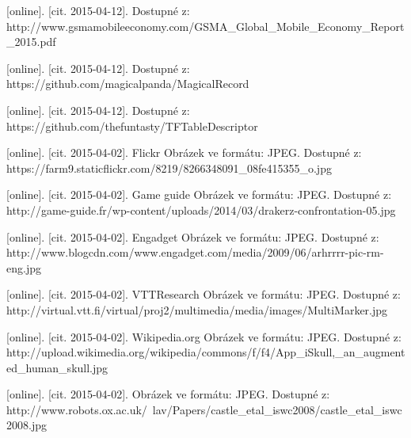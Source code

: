 \documentclass[twoside,12pt]{article}
\begin{document}
\begin{literatura}
{
	[online]. [cit. 2015-04-12]. Dostupné z: http://www.gsmamobileeconomy.com/GSMA\_Global\_Mobile\_Economy\_Report\_2015.pdf
}

{
	[online]. [cit. 2015-04-12]. Dostupné z: https://github.com/magicalpanda/MagicalRecord
}

{
	[online]. [cit. 2015-04-12]. Dostupné z: https://github.com/thefuntasty/TFTableDescriptor
}



{
	[online]. [cit. 2015-04-02]. Flickr
	Obrázek ve formátu: JPEG. Dostupné z: https://farm9.staticflickr.com/8219/8266348091\_08fe415355\_o.jpg
}

{
	[online]. [cit. 2015-04-02]. Game guide
	Obrázek ve formátu: JPEG. Dostupné z: http://game-guide.fr/wp-content/uploads/2014/03/drakerz-confrontation-05.jpg
}

{
	[online]. [cit. 2015-04-02]. Engadget
	Obrázek ve formátu: JPEG. Dostupné z: http://www.blogcdn.com/www.engadget.com/media/2009/06/arhrrrr-pic-rm-eng.jpg
}

{
	[online]. [cit. 2015-04-02]. VTTResearch
	Obrázek ve formátu: JPEG. Dostupné z: http://virtual.vtt.fi/virtual/proj2/multimedia/media/images/MultiMarker.jpg
}

{
	[online]. [cit. 2015-04-02]. Wikipedia.org
	Obrázek ve formátu: JPEG. Dostupné z: http://upload.wikimedia.org/wikipedia/commons/f/f4/App\_iSkull,\_an\_augmented\_human\_skull.jpg
}

{
	[online]. [cit. 2015-04-02]. 
	Obrázek ve formátu: JPEG. Dostupné z: http://www.robots.ox.ac.uk/~lav/Papers/castle\_etal\_iswc2008/castle\_etal\_iswc2008.jpg
}


\end{literatura}
\end{document}
